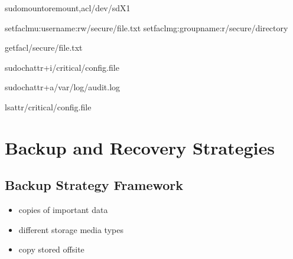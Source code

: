 \documentclass[letterpaper,10pt,english]{sphinxmanual}
\begin{document}
\sphinxAtStartPar
{}

\begin{sphinxVerbatim}[commandchars=\\\{\}]
sudomount\PYGZhy{}oremount,acl/dev/sdX1

setfacl\PYGZhy{}mu:username:rw/secure/file.txt
setfacl\PYGZhy{}mg:groupname:r/secure/directory

getfacl/secure/file.txt
\end{sphinxVerbatim}

\sphinxAtStartPar
{}

\begin{sphinxVerbatim}[commandchars=\\\{\}]
sudochattr+i/critical/config.file

sudochattr+a/var/log/audit.log

lsattr/critical/config.file
\end{sphinxVerbatim}


\section{Backup and Recovery Strategies}
\label{\detokenize{best-practices:backup-and-recovery-strategies}}

\subsection{Backup Strategy Framework}
\label{\detokenize{best-practices:backup-strategy-framework}}
\sphinxAtStartPar
{}
\begin{itemize}
\item {} 
\sphinxAtStartPar
{} copies of important data

\item {} 
\sphinxAtStartPar
{} different storage media types

\item {} 
\sphinxAtStartPar
{} copy stored off\sphinxhyphen{}site

\end{itemize}
\end{document}
